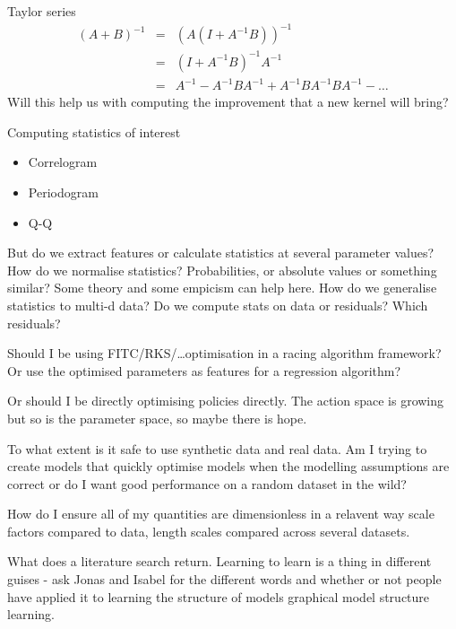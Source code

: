 \documentclass[twoside,11pt]{article}
\begin{document}
Taylor series \eg
\begin{eqnarray}
  (A+B)^{-1} & = & (A(I+A^{-1}B))^{-1} \\
             & = & (I + A^{-1}B)^{-1}A^{-1} \\
             & = & A^{-1} - A^{-1}BA^{-1} + A^{-1}BA^{-1}BA^{-1} - \dots
\end{eqnarray}
Will this help us with computing the improvement that a new kernel will bring?

Computing statistics of interest
\begin{itemize}
  \item Correlogram
  \item Periodogram
  \item Q-Q
\end{itemize}
But do we extract features or calculate statistics at several parameter values?
How do we normalise statistics?
Probabilities, or absolute values or something similar?
Some theory and some empicism can help here.
How do we generalise statistics to multi-d data?
Do we compute stats on data or residuals?
Which residuals?

Should I be using FITC/RKS/\dots optimisation in a racing algorithm framework?
Or use the optimised parameters as features for a regression algorithm?

Or should I be directly optimising policies directly.
The action space is growing but so is the parameter space, so maybe there is hope.

To what extent is it safe to use synthetic data and real data.
Am I trying to create models that quickly optimise models when the modelling assumptions are correct or do I want good performance on a random dataset in the wild?

How do I ensure all of my quantities are dimensionless in a relavent way \eg scale factors compared to data, length scales compared across several datasets.

What does a literature search return.
Learning to learn is a thing in different guises - ask Jonas and Isabel for the different words and whether or not people have applied it to learning the structure of models \eg graphical model structure learning.

\newpage


\vskip 0.2in

\end{document}
